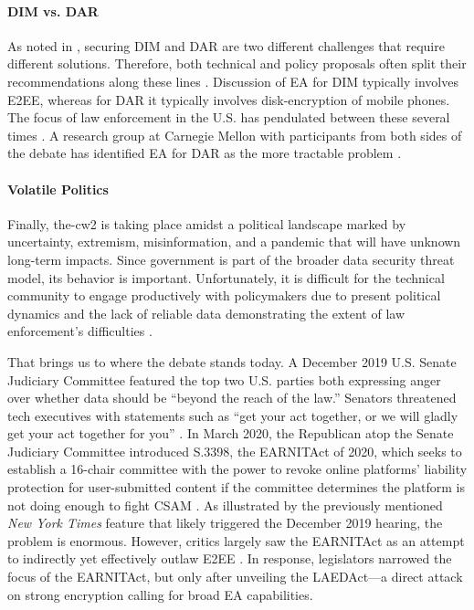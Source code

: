 \paragraph*{\ac{DIM} vs. \ac{DAR}} As noted in , securing \acl{DIM} and \acl{DAR} are two
different challenges that require different solutions. Therefore, both technical and policy proposals often split their
recommendations along these lines \cite{group_2019} \cite{owen_law_2018}. Discussion of \ac{EA} for \ac{DIM} typically
involves \ac{E2EE}, whereas for \ac{DAR} it typically involves \ac{disk-encryption} of mobile phones. The focus of law
enforcement in the U.S. has pendulated between these several times \cite{schneier_2019}. A research group at Carnegie
Mellon with participants from both sides of the debate has identified \ac{EA} for \ac{DAR} as the more tractable problem
\cite{group_2019}.

\paragraph*{Volatile Politics} Finally, \ac{the-cw2} is taking place amidst a political landscape marked by uncertainty,
extremism, misinformation, and a pandemic that will have unknown long-term impacts. Since government is part of the
broader data security threat model, its behavior is important. Unfortunately, it is difficult for the technical
community to engage productively with policymakers due to present political dynamics and the lack of reliable data
demonstrating the extent of law enforcement's difficulties \cite{granick_2018}.

That brings us to where the debate stands today. A December 2019 U.S. Senate Judiciary Committee featured the top two
U.S. parties both expressing anger over whether data should be ``beyond the reach of the law.'' Senators threatened tech
executives with statements such as ``get your act together, or we will gladly get your act together for you''
\cite{geller_2019}. In March 2020, the Republican atop the Senate Judiciary Committee introduced S.3398, the
\ac{EARNITAct} of 2020, which seeks to establish a 16-chair committee with the power to revoke online platforms'
liability protection for user-submitted content if the committee determines the platform is not doing enough to fight
\ac{CSAM} \cite{graham_s3398_2020}. As illustrated by the previously mentioned \textit{New York Times} feature
\cite{keller_internet_2019} that likely triggered the December 2019 hearing, the problem is enormous. However, critics
largely saw the \ac{EARNITAct} as an attempt to indirectly yet effectively outlaw \ac{E2EE} \cite{newman_2020}
\cite{pfefferkorn_2020}. In response, legislators narrowed the focus of the \ac{EARNITAct}, but only after unveiling the
\ac{LAEDAct}---a direct attack on strong encryption calling for broad \acl{EA} capabilities.

